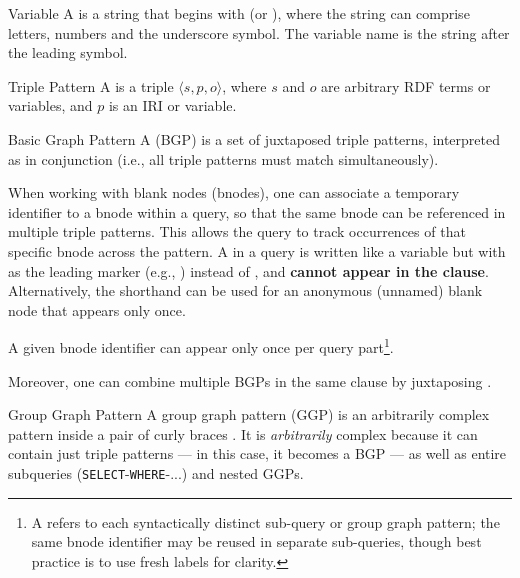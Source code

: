 \begin{definition}{Variable}
    A  is a string that begins with  (or \code{\$}), where the string can comprise letters, numbers and the underscore symbol. The variable name is the string after the leading symbol.
\end{definition}

\begin{definition}{Triple Pattern}
    A  is a triple \(\langle s, p, o\rangle\), where \(s\) and \(o\) are arbitrary RDF terms or variables, and \(p\) is an IRI or variable.
\end{definition}

\begin{definition}{Basic Graph Pattern}
    A  (BGP) is a set of juxtaposed triple patterns, interpreted as in conjunction (i.e., all triple patterns must match simultaneously).
\end{definition}

When working with blank nodes (bnodes), one can associate a temporary identifier to a bnode within a query, so that the same bnode can be referenced in multiple triple patterns. This allows the query to track occurrences of that specific bnode across the pattern.
A  in a query is written like a variable but with \code{\_:} as the leading marker (e.g., ) instead of , and \textbf{cannot appear in the  clause}. 
Alternatively, the shorthand \code{[]} can be used for an anonymous (unnamed) blank node that appears only once.

A given bnode identifier can appear only once per query part\footnote{A  refers to each syntactically distinct sub-query or group graph pattern; the same bnode identifier may be reused in separate sub-queries, though best practice is to use fresh labels for clarity.}.

Moreover, one can combine multiple BGPs in the same  clause by juxtaposing .

\begin{definition}{Group Graph Pattern}
    A group graph pattern (GGP) is an arbitrarily complex pattern inside a pair of curly braces .
    It is \emph{arbitrarily} complex because it can contain just triple patterns --- in this case, it becomes a BGP --- as well as entire subqueries (\texttt{SELECT}-\texttt{WHERE}-...) and nested GGPs.
\end{definition}

